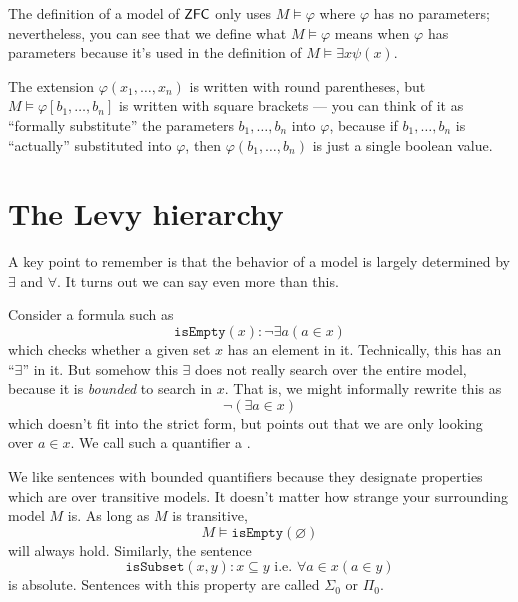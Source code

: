 \begin{remark}
	The definition of a model of $\mathsf{ZFC}$ only uses $M \vDash \varphi$ where $\varphi$ has no
	parameters; nevertheless, you can see that we define what $M \vDash \varphi$ means when
	$\varphi$ has parameters because it's used in the definition of $M \vDash \exists x \psi(x)$.

	The extension $\varphi(x_1, \dots, x_n)$ is written with round parentheses, but $M \vDash
	\varphi[b_1, \dots, b_n]$ is written with square brackets --- you can think of it as ``formally
	substitute'' the parameters $b_1, \dots, b_n$ into $\varphi$, because if $b_1, \dots, b_n$ is
	``actually'' substituted into $\varphi$, then $\varphi(b_1, \dots, b_n)$ is just a single
	boolean value.
\end{remark}

\section{The Levy hierarchy}
A key point to remember is that the behavior of a model is largely determined by $\exists$ and $\forall$.
It turns out we can say even more than this.

Consider a formula such as
\[ \mathtt{isEmpty}(x) : \neg \exists a (a \in x) \]
which checks whether a given set $x$ has an element in it.
Technically, this has an ``$\exists$'' in it.
But somehow this $\exists$ does not really search over the entire model,
because it is \emph{bounded} to search in $x$.
That is, we might informally rewrite this as
\[ \neg (\exists a \in x) \]
which doesn't fit into the strict form,
but points out that we are only looking over $a \in x$.
We call such a quantifier a .

We like sentences with bounded quantifiers because they designate
properties which are  over transitive models.
It doesn't matter how strange your surrounding model $M$ is.
As long as $M$ is transitive,
\[ M \vDash \mathtt{isEmpty}(\varnothing) \]
will always hold.
Similarly, the sentence
\[ \mathtt{isSubset}(x,y) : x \subseteq y \text { i.e. } \forall a \in x (a \in y) \]
is absolute.
Sentences with this property are called $\Sigma_0$ or $\Pi_0$.

